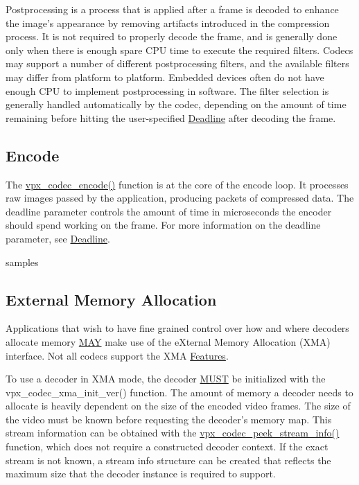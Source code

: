 \-Postprocessing is a process that is applied after a frame is decoded to enhance the image's appearance by removing artifacts introduced in the compression process. \-It is not required to properly decode the frame, and is generally done only when there is enough spare \-C\-P\-U time to execute the required filters. \-Codecs may support a number of different postprocessing filters, and the available filters may differ from platform to platform. \-Embedded devices often do not have enough \-C\-P\-U to implement postprocessing in software. \-The filter selection is generally handled automatically by the codec, depending on the amount of time remaining before hitting the user-\/specified \hyperlink{usage_usage_deadline}{\-Deadline} after decoding the frame. \hypertarget{usage_encode}{}\subsection{\-Encode}\label{usage_encode}
\-The \hyperlink{group__encoder_gaf990542e2aeb389f05fae3e9c7803639}{vpx\-\_\-codec\-\_\-encode()} function is at the core of the encode loop. \-It processes raw images passed by the application, producing packets of compressed data. \-The {\ttfamily deadline} parameter controls the amount of time in microseconds the encoder should spend working on the frame. \-For more information on the {\ttfamily deadline} parameter, see \hyperlink{usage_usage_deadline}{\-Deadline}.

samples \hypertarget{usage_xma}{}\subsection{\-External \-Memory \-Allocation}\label{usage_xma}
\-Applications that wish to have fine grained control over how and where decoders allocate memory \hyperlink{rfc2119_MAY}{\-M\-A\-Y} make use of the e\-Xternal \-Memory \-Allocation (\-X\-M\-A) interface. \-Not all codecs support the \-X\-M\-A \hyperlink{usage_usage_features}{\-Features}.

\-To use a decoder in \-X\-M\-A mode, the decoder \hyperlink{rfc2119_MUST}{\-M\-U\-S\-T} be initialized with the vpx\-\_\-codec\-\_\-xma\-\_\-init\-\_\-ver() function. \-The amount of memory a decoder needs to allocate is heavily dependent on the size of the encoded video frames. \-The size of the video must be known before requesting the decoder's memory map. \-This stream information can be obtained with the \hyperlink{group__decoder_gadfee4664d644175d5aac1465ef11c4b0}{vpx\-\_\-codec\-\_\-peek\-\_\-stream\-\_\-info()} function, which does not require a constructed decoder context. \-If the exact stream is not known, a stream info structure can be created that reflects the maximum size that the decoder instance is required to support.

